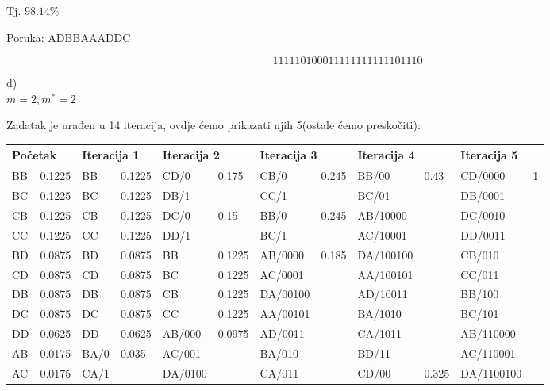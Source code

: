\documentclass[12pt]{article}
\begin{document}
Tj. $98.14\%$

Poruka: ADBBAAADDC

$$111110100011111111111101110$$

\newpage

d)\\

$m = 2, m^{*} = 2$

Zadatak je urađen u 14 iteracija, ovdje ćemo prikazati njih 5(ostale ćemo preskočiti):

\begin{table}[hp]
\hspace*{-1.25in}
\begin{tabular}{|l|l|l|l|l|l|l|l|l|l|l|l|}
\hline
\multicolumn{2}{|l|}{Početak} & \multicolumn{2}{l|}{Iteracija 1} & \multicolumn{2}{l|}{Iteracija 2} & \multicolumn{2}{l|}{Iteracija 3} & \multicolumn{2}{l|}{Iteracija 4} & \multicolumn{2}{l|}{Iteracija 5} \\ \hline
BB & 0.1225 & BB & 0.1225 & CD/0 & \multirow{2}{*}{0.175} & CB/0 & \multirow{2}{*}{0.245} & BB/00 & \multirow{10}{*}{0.43} & CD/0000 & \multirow{16}{*}{1} \\ \cline{1-5}
BC & 0.1225 & BC & 0.1225 & DB/1 &  & CC/1 &  & BC/01 &  & DB/0001 &  \\ \cline{1-8}
CB & 0.1225 & CB & 0.1225 & DC/0 & \multirow{2}{*}{0.15} & BB/0 & \multirow{2}{*}{0.245} & AB/10000 &  & DC/0010 &  \\ \cline{1-5}
CC & 0.1225 & CC & 0.1225 & DD/1 &  & BC/1 &  & AC/10001 &  & DD/0011 &  \\ \cline{1-8}
BD & 0.0875 & BD & 0.0875 & BB & 0.1225 & AB/0000 & \multirow{8}{*}{0.185} & DA/100100 &  & CB/010 &  \\ \cline{1-6}
CD & 0.0875 & CD & 0.0875 & BC & 0.1225 & AC/0001 &  & AA/100101 &  & CC/011 &  \\ \cline{1-6}
DB & 0.0875 & DB & 0.0875 & CB & 0.1225 & DA/00100 &  & AD/10011 &  & BB/100 &  \\ \cline{1-6}
DC & 0.0875 & DC & 0.0875 & CC & 0.1225 & AA/00101 &  & BA/1010 &  & BC/101 &  \\ \cline{1-6}
DD & 0.0625 & DD & 0.0625 & AB/000 & \multirow{7}{*}{0.0975} & AD/0011 &  & CA/1011 &  & AB/110000 &  \\ \cline{1-4}
AB & 0.0175 & BA/0 & \multirow{2}{*}{0.035} & AC/001 &  & BA/010 &  & BD/11 &  & AC/110001 &  \\ \cline{1-2} \cline{9-10}
AC & 0.0175 & CA/1 &  & DA/0100 &  & CA/011 &  & CD/00 & \multirow{4}{*}{0.325} & DA/1100100 &  \\ \cline{1-4}

\end{tabular}
\end{table}
\end{document}
